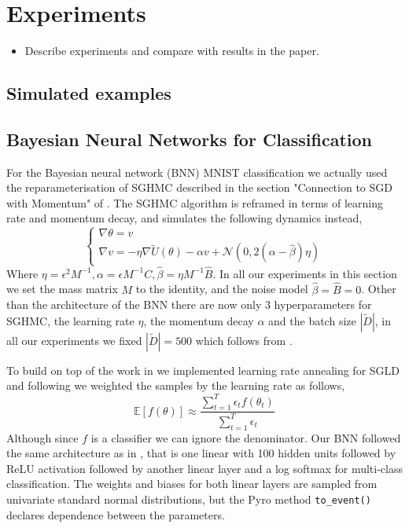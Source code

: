 
\section{Experiments}

\begin{itemize}
    \item Describe experiments and compare with results in the paper.
\end{itemize}

\subsection{Simulated examples}

\subsection{Bayesian Neural Networks for Classification}
For the Bayesian neural network (BNN) MNIST classification we actually used the reparameterisation of SGHMC described in the section "Connection to SGD with Momentum" of \cite{sghmc}. The SGHMC algorithm is reframed in terms of learning rate and momentum decay, and simulates the following dynamics instead,
$$\begin{cases}
\nabla \theta = v\\
\nabla v = - \eta \nabla \tilde{U}(\theta) - \alpha v + \mathcal{N}(0, 2(\alpha - \hat{\beta}) \eta)
\end{cases}$$
Where $\eta = \epsilon^2 M^{-1}, \alpha = \epsilon M^{-1}C, \hat{\beta} = \eta M^{-1}\hat{B}$. In all our experiments in this section we set the mass matrix $M $ to the identity, and the noise model $\hat{\beta} = \hat{B} = 0$. Other than the architecture of the BNN there are now only 3 hyperparameters for SGHMC, the learning rate $\eta$, the momentum decay $\alpha$ and the batch size $|\tilde{D}|$, in all our experiments we fixed $|\tilde{D}| = 500$ which follows from \cite{sghmc}.

To build on top of the work in \cite{sghmc} we implemented learning rate annealing for SGLD and following \cite{sgld} we weighted the samples by the learning rate as follows,
$$\mathbb{E}[f(\theta)] \approx \frac{\sum^T_{t=1} \epsilon_t f(\theta_t)}{\sum^T_{t=1} \epsilon_t}$$
Although since $f$ is a classifier we can ignore the denominator. Our BNN followed the same architecture as in \cite{sghmc}, that is one linear with 100 hidden units followed by ReLU activation followed by another linear layer and a log softmax for multi-class classification. The weights and biases for both linear layers are sampled from univariate standard normal distributions, but the Pyro method \texttt{to\_event()} declares dependence between the parameters. 

